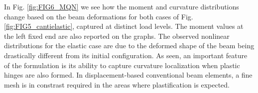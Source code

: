 \begin{figure*}[b]
	\centering
	\qquad
	\caption{Geometrically nonlinear analyses of cantilever.}%
	\label{fig:FIG5_cantielastic}%
\end{figure*}

\begin{table*}[t]\centering
	\caption{Comparison of tip normalized displacements for different load 
	levels
		for elastic response.}
	\noindent{}
	\label{table:table1}
\end{table*}

In Fig. \ref{fig:FIG6_MQN} we see how the moment and curvature
distributions change based on the beam deformations for both cases of Fig.
\ref{fig:FIG5_cantielastic}, captured at distinct
load levels. The moment values at the left fixed end are also reported on
the graphs. The observed nonlinear distributions for the elastic case are due 
to the
deformed shape of the beam being drastically different from its initial
configuration. As seen, an important feature of the formulation is its ability 
to capture curvature localization when plastic hinges are also formed. In 
displacement-based conventional beam elements, a fine mesh is in constrast 
required in the areas where plastification is expected.

